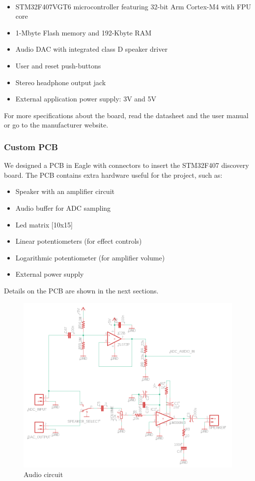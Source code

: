 \begin{itemize}
    \item STM32F407VGT6 microcontroller featuring 32-bit Arm\textsuperscript{\textregistered} Cortex\textsuperscript{\textregistered}-M4 with FPU core
    \item 1-Mbyte Flash memory and 192-Kbyte RAM
    \item Audio DAC with integrated class D speaker driver
    \item User and reset push-buttons
    \item Stereo headphone output jack
    \item External application power supply: 3V and 5V
\end{itemize}
For more specifications about the board, read the datasheet and the user manual or go to the manufacturer website.

\subsubsection{Custom PCB}
\label{sec:PCB}
We designed a PCB in Eagle with connectors to insert the STM32F407 discovery board.
The PCB contains extra hardware useful for the project, such as:
\begin{itemize}
    \item Speaker with an amplifier circuit
    \item Audio buffer for ADC sampling
    \item Led matrix [10x15]
    \item Linear potentiometers (for effect controls)
    \item Logarithmic potentiometer (for amplifier volume)
    \item External power supply
\end{itemize}

Details on the PCB are shown in the next sections.

\label{sec:Circuit}

    \begin{figure}[H]
      \centering
        \includegraphics[width=\textwidth]{img/audio.png}
        \caption{Audio circuit}
    \end{figure}
    
